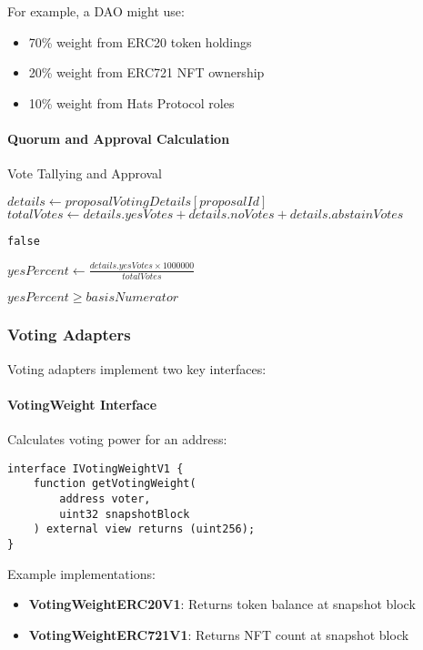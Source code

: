 \documentclass[11pt,a4paper]{article}
\begin{document}
For example, a DAO might use:
\begin{itemize}
    \item 70\% weight from ERC20 token holdings
    \item 20\% weight from ERC721 NFT ownership
    \item 10\% weight from Hats Protocol roles
\end{itemize}

\paragraph{Quorum and Approval Calculation}

\begin{algorithm}
\caption{Vote Tallying and Approval}
\begin{algorithmic}[1]
    \State $details \gets proposalVotingDetails[proposalId]$
    \State $totalVotes \gets details.yesVotes + details.noVotes + details.abstainVotes$

        \State \Return \texttt{false}
    \EndIf

    \State $yesPercent \gets \frac{details.yesVotes \times 1000000}{totalVotes}$

    \State \Return $yesPercent \geq basisNumerator$
\EndFunction
\end{algorithmic}
\end{algorithm}

\subsubsection{Voting Adapters}

Voting adapters implement two key interfaces:

\paragraph{VotingWeight Interface} Calculates voting power for an address:

\begin{lstlisting}[caption=VotingWeight Interface]
interface IVotingWeightV1 {
    function getVotingWeight(
        address voter,
        uint32 snapshotBlock
    ) external view returns (uint256);
}
\end{lstlisting}

Example implementations:
\begin{itemize}
    \item \textbf{VotingWeightERC20V1}: Returns token balance at snapshot block
    \item \textbf{VotingWeightERC721V1}: Returns NFT count at snapshot block
\end{itemize}
\end{document}
